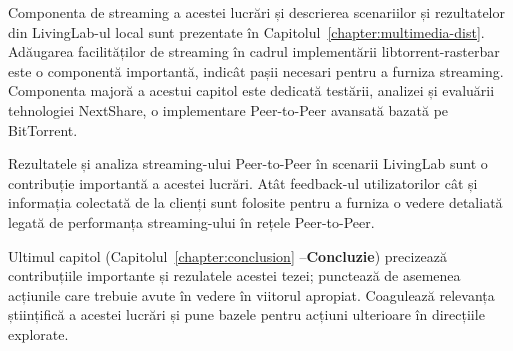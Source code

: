 Componenta de streaming a acestei lucrări și descrierea scenariilor și
rezultatelor din LivingLab-ul local sunt prezentate în
Capitolul~\ref{chapter:multimedia-dist}. Adăugarea facilităților de streaming
în cadrul implementării libtorrent-rasterbar este o componentă importantă,
indicât pașii necesari pentru a furniza streaming. Componenta majoră a acestui
capitol este dedicată testării, analizei și evaluării tehnologiei NextShare, o
implementare Peer-to-Peer avansată bazată pe BitTorrent.

Rezultatele și analiza streaming-ului Peer-to-Peer în scenarii LivingLab sunt
o contribuție importantă a acestei lucrări. Atât feedback-ul utilizatorilor
cât și informația colectată de la clienți sunt folosite pentru a furniza o
vedere detaliată legată de performanța streaming-ului în rețele Peer-to-Peer.

Ultimul capitol (Capitolul~\ref{chapter:conclusion} --\textbf{Concluzie})
precizează contribuțiile importante și rezulatele acestei tezei; punctează de
asemenea acțiunile care trebuie avute în vedere în viitorul apropiat.
Coagulează relevanța științifică a acestei lucrări și pune bazele pentru
acțiuni ulterioare în direcțiile explorate.
